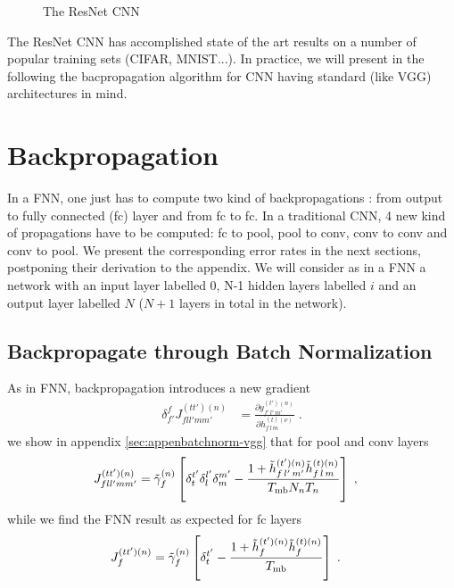 \begin{figure}[H]
\begin{center}
\caption{The ResNet CNN}
\end{center}
\end{figure}


The ResNet CNN has accomplished state of the art results on a number of popular training sets (CIFAR, MNIST...). In practice, we will present in the following the bacpropagation algorithm for CNN having standard (like VGG) architectures in mind.

\section{Backpropagation}

In a FNN, one just has to compute two kind of backpropagations : from output to fully connected (fc) layer and from fc to fc. In a traditional CNN, 4 new kind of propagations have to be computed: fc to pool, pool to conv, conv to conv and conv to pool. We present the corresponding error rates in the next sections, postponing their derivation to the appendix. We will consider as in a FNN a network with an input layer labelled $0$, N-1 hidden layers labelled $i$ and an output layer labelled $N$ ($N+1$ layers in total in the network).


\subsection{Backpropagate through Batch Normalization} \label{sec:BackpropbatchnormCNN}

As in FNN, backpropagation introduces a new gradient 
\begin{align}
\delta^f_{f'}J^{(tt')(n)}_{fll'mm'}&=
%
\frac{\partial y^{(t')(n)}_{f'\,l'\,m'}}{\partial h_{f\,l\,m}^{(t)(\nu)}}\;.
\end{align}
we show in appendix \ref{sec:appenbatchnorm-vgg} that for pool and conv layers
\begin{align}
J^{(tt')(n)}_{fll'mm'}&=\tilde{\gamma}^{(n)}_f \left[\delta^{t'}_t\delta^{l'}_l\delta^{m'}_m-
%
\frac{1+\tilde{h}_{f\,l'\,m'}^{(t')(n)}\tilde{h}_{f\,l\,m}^{(t)(n)}}{T_{{\rm mb}}N_nT_n}\right]\;,
\end{align}
while we find the FNN result as expected for fc layers 
\begin{align}
J^{(tt')(n)}_{f}&=\tilde{\gamma}^{(n)}_f \left[\delta^{t'}_t-
%
\frac{1+\tilde{h}_{f}^{(t')(n)}\tilde{h}_{f}^{(t)(n)}}{T_{{\rm mb}}}\right]\;.
\end{align}

